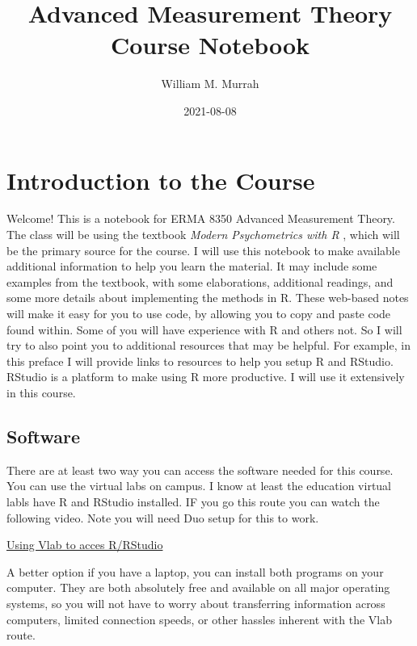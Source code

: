 \documentclass[
]{book}
\title{Advanced Measurement Theory Course Notebook}
\author{William M. Murrah}
\date{2021-08-08}
\begin{document}
\maketitle

{
\setcounter{tocdepth}{1}
\tableofcontents
}
\hypertarget{introduction-to-the-course}{%
\chapter*{Introduction to the Course}\label{introduction-to-the-course}}

Welcome!
This is a notebook for ERMA 8350 Advanced Measurement Theory.
The class will be using the textbook \emph{Modern Psychometrics with R} \citep{mair2018modern}, which will be the primary source for the course.
I will use this notebook to make available additional information to help you learn the material.
It may include some examples from the textbook, with some elaborations, additional readings, and some more details about implementing the methods in R.
These web-based notes will make it easy for you to use code, by allowing you to copy and paste code found within.
Some of you will have experience with R and others not.
So I will try to also point you to additional resources that may be helpful.
For example, in this preface I will provide links to resources to help you setup R and RStudio.
RStudio is a platform to make using R more productive.
I will use it extensively in this course.

\hypertarget{software}{%
\section*{Software}\label{software}}

There are at least two way you can access the software needed for this course.
You can use the virtual labs on campus.
I know at least the education virtual labls have R and RStudio installed.
IF you go this route you can watch the following video.
Note you will need Duo setup for this to work.

\href{https://nv.instructuremedia.com/fetch/QkFoYkIxc0hhUVNIRGFrSE1Hd3JCeWhUREdFPS0tZjk4ODFlYWEyZWFiNWQwYWYyZDk0YTZjMjljZTJlMjBkNmIwMzE5Yw.mp4}{Using Vlab to acces R/RStudio}

A better option if you have a laptop, you can install both programs on your computer.
They are both absolutely free and available on all major operating systems, so you will not have to worry about transferring information across computers, limited connection speeds, or other hassles inherent with the Vlab route.
\end{document}
